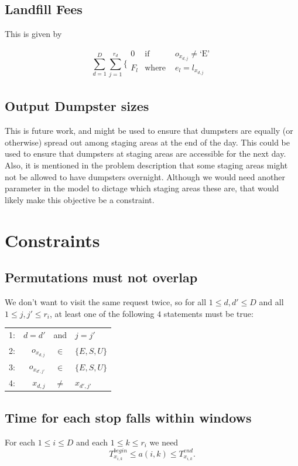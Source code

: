 \documentclass{article}
\begin{document}
\subsection{Landfill Fees}
This is given by

\[
\sum_{d=1}^D \sum_{j=1}^{r_d }
\{ \begin{array}{ccc}
 0 & \mbox {if } & o_{x_{d,j}}  \ne \mbox{`E'} \\
 F_l & \mbox{where } & e_l = l_{x_{d,j}} \\
\end{array}
\]


\subsection{Output Dumpster sizes}
This is future work, and might be used to ensure that dumpsters are equally (or otherwise) spread out among staging areas at the end of the day.
This could be used to ensure that dumpsters at staging areas are accessible for the next day.
Also, it is mentioned in the problem description that some staging areas might not be allowed to have dumpsters overnight.
Although we would need another parameter in the model to dictage which staging areas these are, that would likely make this objective be a constraint.

\section {Constraints}

\subsection{Permutations must not overlap}
We don't want to visit the same request twice, so for all $1 \le d, d' \le D$ and all $1 \le j, j' \le r_i$, at least one of the following $4$ statements must be true:

\begin{tabular}{ l r  c  l }
1: & $ d=d'$ & and & $j = j'$ \\
2: & $ o_{x_{d,j}}$ & $\in$ & $\{E, S, U\}$ \\
3: & $ o_{x_{d',j'}}$ & $\in$ & $\{E, S, U\}$ \\
4: & $x_{d,j}$ & $\ne$ & $x_{d', j'}$ \\
\end{tabular}

\subsection{Time for each stop falls within windows}
For each $1 \le i \le D$ and each $1 \le k \le r_i$ we need
$$ T^{begin}_{x_{i,k}} \le a(i, k) \le  T^{end}_{x_{i,k}}.$$
\end{document}
